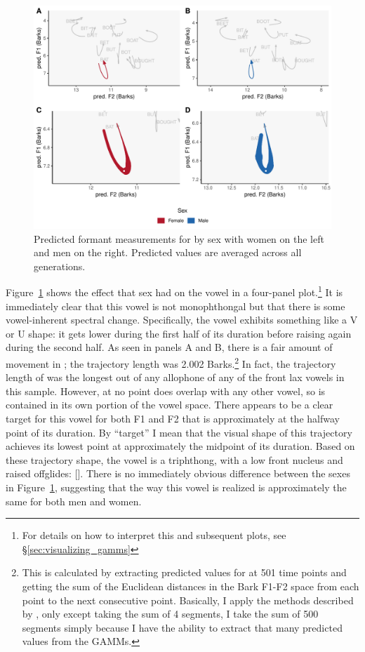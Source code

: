 \begin{figure}[tb!]
	\centering
	\includegraphics[width = 6.5in]{Figures/BAT/BAT_four_panel_plot_summarized.pdf}
	\caption[Predicted formant measurements for \bat by sex.]{Predicted formant measurements for \bat by sex with women on the left and men on the right. Predicted values are averaged across all generations.}
	\label{fig:BAT_four_panel_summarized}
\end{figure}

Figure~\ref{fig:BAT_four_panel_summarized} shows the effect that sex had on the \bat vowel in a four-panel plot.\footnote{For details on how to interpret this and subsequent plots, see \S\ref{sec:visualizing_gamms}} It is immediately clear that this vowel is not monophthongal but that there is some vowel-inherent spectral change. Specifically, the vowel exhibits something like a V or U shape: it gets lower during the first half of its duration before raising again during the second half. As seen in panels A and B, there is a fair amount of movement in \bat; the trajectory length was 2.002 Barks.\footnote{This is calculated by extracting predicted values for \bat at 501 time points and getting the sum of the Euclidean distances in the Bark F1-F2 space from each point to the next consecutive point. Basically, I apply the methods described by \citet{fox_jacewicz_2009}, only except taking the sum of 4 segments, I take the sum of 500 segments simply because I have the ability to extract that many predicted values from the GAMMs.} In fact, the trajectory length of \bat was the longest out of any allophone of any of the front lax vowels in this sample. However, at no point does \bat overlap with any other vowel, so \bat is contained in its own portion of the vowel space. There appears to be a clear target for this vowel for both F1 and F2 that is approximately at the halfway point of its duration. By ``target'' I mean that the visual shape of this trajectory achieves its lowest point at approximately the midpoint of its duration. Based on these trajectory shape, the vowel is a triphthong, with a low front nucleus and raised offglides: []. There is no immediately obvious difference between the sexes in Figure~\ref{fig:BAT_four_panel_summarized}, suggesting that the way this vowel is realized is approximately the same for both men and women.

